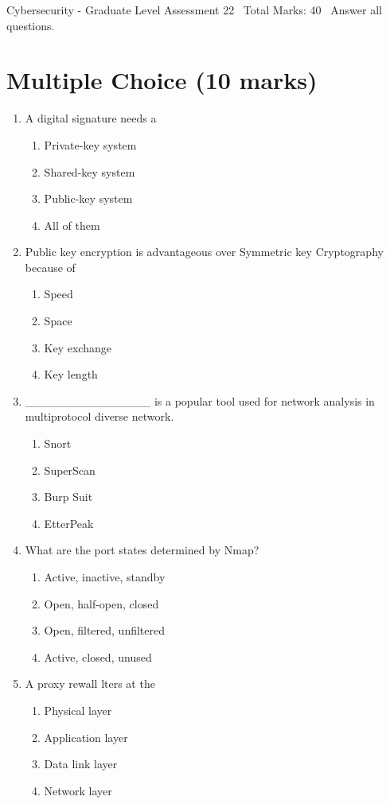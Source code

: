 \documentclass[12pt]{article}
\begin{document}
\begin{center}
Cybersecurity - Graduate Level Assessment 22 \
Total Marks: 40 \
Answer all questions.
\end{center}

\section*{Multiple Choice (10 marks)}
\begin{enumerate}[label=\arabic*.]
\item A digital signature needs a
\begin{enumerate}[label=(\alph*)]
    \item Private-key system
    \item Shared-key system
    \item Public-key system
    \item All of them
\end{enumerate}
\item Public key encryption is advantageous over Symmetric key Cryptography because of
\begin{enumerate}[label=(\alph*)]
    \item Speed
    \item Space
    \item Key exchange
    \item Key length
\end{enumerate}
\item \_\_\_\_\_\_\_\_\_\_\_\_\_\_\_ is a popular tool used for network analysis in multiprotocol diverse network.
\begin{enumerate}[label=(\alph*)]
    \item Snort
    \item SuperScan
    \item Burp Suit
    \item EtterPeak
\end{enumerate}
\item What are the port states determined by Nmap?
\begin{enumerate}[label=(\alph*)]
    \item Active, inactive, standby
    \item Open, half-open, closed
    \item Open, filtered, unfiltered
    \item Active, closed, unused
\end{enumerate}
\item A proxy rewall lters at the
\begin{enumerate}[label=(\alph*)]
    \item Physical layer
    \item Application layer
    \item Data link layer
    \item Network layer
\end{enumerate}
\end{enumerate}
\end{document}
